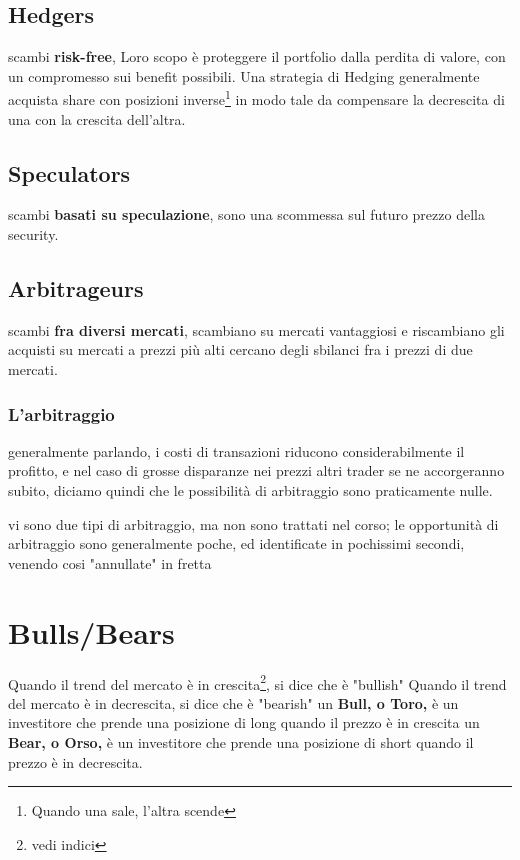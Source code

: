 \documentclass[a4paper,11pt]{report}
\begin{document}
{\subsection{Hedgers}
	scambi \textbf{risk-free}, \newline
	Loro scopo è proteggere il portfolio dalla perdita di valore, con un compromesso sui benefit possibili.\newline
	Una strategia di Hedging generalmente acquista share con posizioni inverse\footnote{Quando una sale, l'altra scende} in 			modo tale da compensare la decrescita di una con la crescita dell'altra.
\subsection{Speculators}
	scambi \textbf{basati su speculazione}, sono una scommessa sul futuro prezzo della security.
\subsection{Arbitrageurs}
	scambi \textbf{fra diversi mercati}, scambiano su mercati vantaggiosi e riscambiano gli acquisti su mercati a prezzi più alti \newline
	cercano degli sbilanci fra i prezzi di due mercati.
\subsubsection{L'arbitraggio}
	generalmente parlando, i costi di transazioni riducono considerabilmente il profitto, e nel caso di grosse disparanze nei prezzi 		altri trader se ne accorgeranno subito, diciamo quindi che le possibilità di arbitraggio sono praticamente nulle.

	vi sono due tipi di arbitraggio, ma non sono trattati nel corso; \newline
	le opportunità di arbitraggio sono generalmente poche, ed identificate in pochissimi secondi, venendo cosi "annullate" in fretta
\newpage
\section{Bulls/Bears} %
	Quando il trend del mercato è in crescita\footnote{vedi indici}, si dice che è "bullish" \newline
	Quando il trend del mercato è in decrescita, si dice che è "bearish" \newline
	un \textbf{Bull, o Toro,} è un investitore che prende una posizione di long quando il prezzo è in crescita \newline
	un \textbf{Bear, o Orso,} è un investitore che prende una posizione di short quando il prezzo è in decrescita. \newline
\emph{}
}
\end{document}

